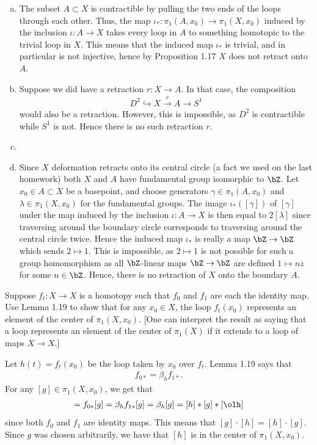 \begin{homework}[e]
\begin{prf}
\begin{enumerate}[(a)]
    \item The subset $A\subset X$ is contractible by pulling the two ends of the loops through each other. Thus, the map $\iota_*:\pi_1(A,x_0) \to \pi_1(X,x_0)$ induced by the inclusion $\iota:A\to X$ takes every loop in $A$ to something homotopic to the trivial loop in $X$. This means that the induced map $\iota_*$ is trivial, and in particular is not injective, hence by Proposition 1.17 $X$ does not retract onto $A$.
    \item Suppose we did have a retraction $r:X\to A$. In that case, the composition
      \begin{align*}
        D^2 \hookrightarrow X \xrightarrow{r} A \to S^1
      \end{align*}
      would also be a retraction. However, this is impossible, as $D^2$ is contractible while $S^1$ is not. Hence there is no such retraction $r$.
    \item 
    \item Since $X$ deformation retracts onto its central circle (a fact we used on the last homework) both $X$ and $A$ have fundamental group isomorphic to $\bZ$. Let $x_0 \in A \subset X$ be a basepoint, and choose generators $\gamma \in \pi_1(A,x_0)$ and $\lambda \in \pi_1(X,x_0)$ for the fundamental groups. The image $\iota_*([\gamma])$ of $[\gamma]$ under the map induced by the inclusion $\iota:A\to X$ is then equal to $2[\lambda]$ since traversing around the boundary circle corresponds to traversing around the central circle twice. Hence the induced map $\iota_*$ is really a map $\bZ\to \bZ$ which sends $2\mapsto 1$. This is impossible, as $2 \mapsto 1$ is not possible for such a group homomorphism as all $\bZ$-linear maps $\bZ\to \bZ$ are defined $1 \mapsto nz$ for some $n \in \bZ$. Hence, there is no retraction of $X$ onto the boundary $A$.
  \end{enumerate}
\end{prf}

 Suppose $f_t:X\to X$ is a homotopy such that $f_0$ and $f_1$ are each the identity map. Use Lemma 1.19 to show that for any $x_0 \in X$, the loop $f_t(x_0)$ represents an element of the center of $\pi_1(X,x_0)$. [One can interpret the result as saying that a loop represents an element of the center of $\pi_1(X)$ if it extends to a loop of maps $X\to X$.]
\begin{prf}
  Let $h(t) = f_t(x_0)$ be the loop taken by $x_0$ over $f_t$. Lemma 1.19 says that
  \begin{align*}
    f_{0*} = \beta_h f_{1*}.
  \end{align*}
  For any $[g] \in \pi_1(X,x_0)$, we get that
  \begin{align*}
    [g] = f_{0*}[g] = \beta_h f_{1*}[g] = \beta_h[g] = [h] * [g] * [\olh]
  \end{align*}
  since both $f_0$ and $f_1$ are identity maps. This means that $[g]\cdot [h] = [h] \cdot [g]$. Since $g$ was chosen arbitrarily, we have that $[h]$ is in the center of $\pi_1(X,x_0)$.
\end{prf}
\newpage


\end{homework}
